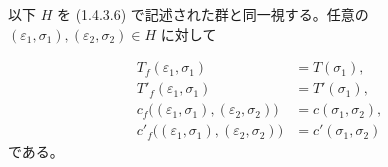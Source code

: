 以下 $H$ を (1.4.3.6) で記述された群と同一視する。任意の
$(\varepsilon_1,\sigma_1),(\varepsilon_2,\sigma_2)\in H$ に対して

\begin{equation}
  \begin{aligned}
    T_f(\varepsilon_1,\sigma_1)&=T(\sigma_1),\\
    T'_f(\varepsilon_1,\sigma_1)&=T'(\sigma_1),\\
    c_f\bigl((\varepsilon_1,\sigma_1),(\varepsilon_2,\sigma_2)\bigr)
      &=c(\sigma_1,\sigma_2),\\
    c'_f\bigl((\varepsilon_1,\sigma_1),(\varepsilon_2,\sigma_2)\bigr)
      &=c'(\sigma_1,\sigma_2)
  \end{aligned}
  \tag{1.4.3.7}
\end{equation}
である。
